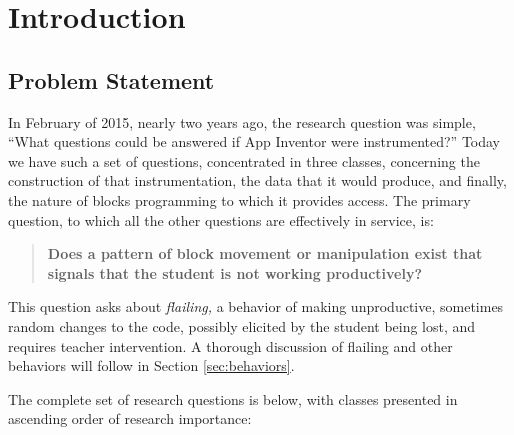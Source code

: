 \chapter{Introduction}

 
\section{Problem Statement} \label{sec:problem-statement}

In February of 2015, nearly two years ago, the research question was simple, ``What questions could be answered if App Inventor were instrumented?'' Today we have such a set of questions, concentrated in three classes, concerning the construction of that instrumentation, the data that it would produce, and finally, the nature of blocks programming to which it provides access. The primary question, to which all the other questions are effectively in service, is:

\begin{quote}
\textbf{Does a pattern of block movement or manipulation exist that signals that the student is not working productively?}
\end{quote}

This question asks about \emph{flailing,} a behavior of making unproductive, sometimes random changes to the code, possibly elicited by the student being lost, and requires teacher intervention. A thorough discussion of flailing and other behaviors will follow in Section \ref{sec:behaviors}.

The complete set of research questions is below, with classes presented in ascending order of research importance:

